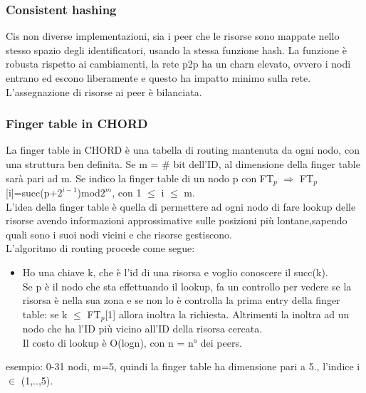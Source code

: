 \documentclass{article}
\begin{document}
\subsubsection{Consistent hashing}
Cis non diverse implementazioni, sia i peer che le risorse sono mappate nello stesso spazio degli identificatori, usando la stessa funzione hash. La funzione è robusta rispetto ai cambiamenti, la rete p2p ha un charn elevato, ovvero i nodi entrano ed escono liberamente e questo ha impatto minimo sulla rete.\\ L'assegnazione di risorse ai peer è bilanciata.
\subsubsection{Finger table in CHORD}
La finger table in CHORD è una tabella di routing mantenuta da ogni nodo, con una struttura ben definita. Se m = \# bit dell'ID, al dimensione della finger table sarà pari ad m. Se indico la finger table di un nodo p con FT$_{p}$ $\Rightarrow$ FT$_{p}$[i]=succ(p+$2^{i-1}$)mod$2^m$, con 1 $\leq$ i $\leq$ m. \\ L'idea della finger table è quella di permettere ad ogni nodo di fare lookup delle risorse avendo informazioni approssimative sulle posizioni più lontane,sapendo quali sono i suoi nodi vicini e che risorse gestiscono.\\ L'algoritmo di routing procede come segue:
\begin{itemize}
\item Ho una chiave k, che è l'id di una risorsa e voglio conoscere il succ(k).
\\ Se p è il nodo che sta effettuando il lookup, fa un controllo per vedere se la risorsa è nella sua zona e se non lo è controlla la prima entry della finger table: se k $\leq$ FT$_{p}$[1] allora inoltra la richiesta. Altrimenti la inoltra ad un nodo che ha l'ID più vicino all'ID della risorsa cercata.\\ Il costo di lookup è O(logn), con n = n° dei peers.
\end{itemize}
esempio: 0-31 nodi, m=5, quindi la finger table ha dimensione pari a 5., l'indice i $\in$ (1,..,5).
\end{document}
